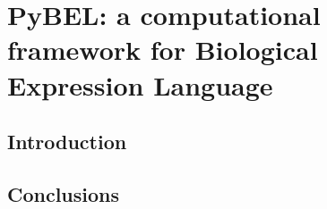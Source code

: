 
\chapter{PyBEL: a computational framework for Biological Expression Language}\label{chap:pybel}

\section*{Introduction}





\section*{Conclusions}
